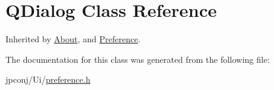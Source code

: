 \hypertarget{class_q_dialog}{}\section{Q\+Dialog Class Reference}
\label{class_q_dialog}


Inherited by \hyperlink{class_about}{About}, and \hyperlink{class_preference}{Preference}.



The documentation for this class was generated from the following file\+:\begin{DoxyCompactItemize}
\item 
jpconj/\+Ui/\hyperlink{preference_8h}{preference.\+h}\end{DoxyCompactItemize}
